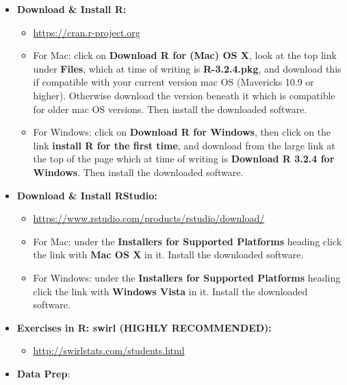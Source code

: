 \documentclass[]{book}
\providecommand{\tightlist}{%
  \setlength{\itemsep}{0pt}\setlength{\parskip}{0pt}}
\begin{document}
\begin{itemize}
\tightlist
\item
  \textbf{Download \& Install R:}

  \begin{itemize}
  \tightlist
  \item
    \url{https://cran.r-project.org}
  \item
    For Mac: click on \textbf{Download R for (Mac) OS X}, look at the top link under \textbf{Files}, which at time of writing is \textbf{R-3.2.4.pkg}, and download this if compatible with your current version mac OS (Mavericks 10.9 or higher). Otherwise download the version beneath it which is compatible for older mac OS versions. Then install the downloaded software.
  \item
    For Windows: click on \textbf{Download R for Windows}, then click on the link \textbf{install R for the first time}, and download from the large link at the top of the page which at time of writing is \textbf{Download R 3.2.4 for Windows}. Then install the downloaded software.
  \end{itemize}
\item
  \textbf{Download \& Install RStudio:}

  \begin{itemize}
  \tightlist
  \item
    \url{https://www.rstudio.com/products/rstudio/download/}
  \item
    For Mac: under the \textbf{Installers for Supported Platforms} heading click the link with \textbf{Mac OS X} in it. Install the downloaded software.
  \item
    For Windows: under the \textbf{Installers for Supported Platforms} heading click the link with \textbf{Windows Vista} in it. Install the downloaded software.
  \end{itemize}
\item
  \textbf{Exercises in R: swirl (HIGHLY RECOMMENDED):}

  \begin{itemize}
  \tightlist
  \item
    \url{http://swirlstats.com/students.html}
  \end{itemize}
\item
  \textbf{Data Prep}:


\end{itemize}
\end{document}
